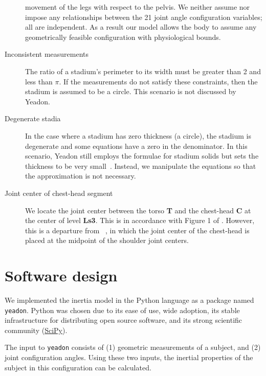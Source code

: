 \documentclass[10pt,a4paper,twocolumn]{article}
\begin{document}
\begin{description}
      movement of the legs with respect to the pelvis. We neither assume nor
      impose any relationships between the 21 joint angle configuration
      variables; all are independent. As a result our model allows the body to
      assume any geometrically feasible configuration with physiological
      bounds.
    \item[Inconsistent measurements] The ratio of a stadium's perimeter to its
      width must be greater than 2 and less than $\pi$. If the measurements do
      not satisfy these constraints, then the stadium is assumed to be a
      circle. This scenario is not discussed by Yeadon.
    \item[Degenerate stadia] In the case where a stadium has zero thickness (a
      circle), the stadium is degenerate and some equations have a zero in the
      denominator. In this scenario, Yeadon still employs the formulae for
      stadium solids but sets the thickness to be very
      small~\cite{Yeadon1990f}.  Instead, we manipulate the equations so that
      the approximation is not necessary.
    \item[Joint center of chest-head segment] We locate the joint center
      between the torso \textbf{T} and the chest-head \textbf{C} at the center
      of level \textbf{Ls3}. This is in accordance with Figure 1 of
      \cite{Yeadon1990e}. However, this is a departure from
      ~\cite{Yeadon1984a}, in which the joint center of the chest-head is
      placed at the midpoint of the shoulder joint centers.
\end{description}

\section*{Software design}

We implemented the inertia model in the Python language as a package named
\verb+yeadon+.  Python was chosen due to its ease of use, wide adoption, its
stable infrastructure for distributing open source software, and its strong
scientific community (\href{http://www.scipy.org}{SciPy}).

The input to \verb+yeadon+ consists of (1) geometric measurements of a subject,
and (2) joint configuration angles. Using these two inputs, the inertial
properties of the subject in this configuration can be calculated.
\end{document}
